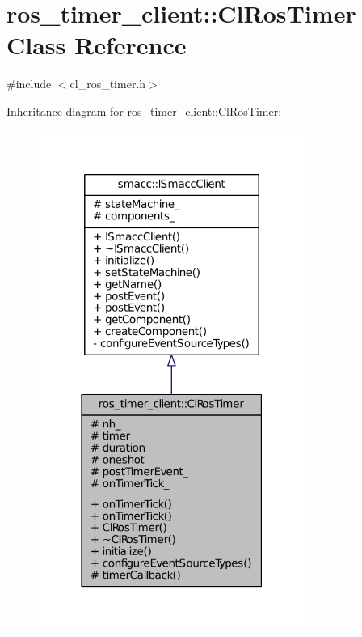 \hypertarget{classros__timer__client_1_1ClRosTimer}{}\section{ros\+\_\+timer\+\_\+client\+:\+:Cl\+Ros\+Timer Class Reference}
\label{classros__timer__client_1_1ClRosTimer}


{\ttfamily \#include $<$cl\+\_\+ros\+\_\+timer.\+h$>$}



Inheritance diagram for ros\+\_\+timer\+\_\+client\+:\+:Cl\+Ros\+Timer\+:
\nopagebreak
\begin{figure}[H]
\begin{center}
\leavevmode
\includegraphics[width=247pt]{classros__timer__client_1_1ClRosTimer__inherit__graph}
\end{center}
\end{figure}


